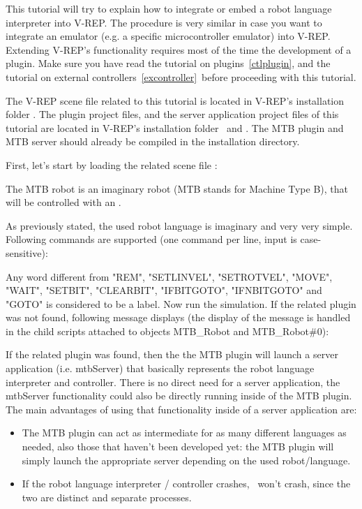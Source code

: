 \label{langtutor}

This tutorial will try to explain how to integrate or embed a robot language 
interpreter into V-REP. The procedure is very similar in case you want to 
integrate an emulator (e.g. a specific microcontroller emulator) into V-REP. 
Extending V-REP's functionality requires most of the time the development 
of a plugin. Make sure you have read the tutorial on plugins\ \ref{ctlplugin}, 
and the tutorial on external controllers\ \ref{excontroller}\ before 
proceeding with this tutorial.

The V-REP scene file related to this tutorial is located in V-REP's 
installation folder . The plugin 
project files, and the server application project files of this tutorial 
are located in V-REP's installation folder \
and . The MTB plugin and MTB server should 
already be compiled in the installation directory.

\clearpage
First, let's start by loading the related scene file 
:


The MTB robot is an imaginary robot (MTB stands for Machine Type B), that 
will be controlled with an \term{imaginary robot language}.

As previously stated, the used robot language is imaginary and very very 
simple. Following commands are supported (one command per line, input is 
case-sensitive):


Any word different from "REM", "SETLINVEL", "SETROTVEL", "MOVE", "WAIT", 
"SETBIT", "CLEARBIT", "IFBITGOTO", "IFNBITGOTO" and "GOTO" is considered to 
be a label. Now run the simulation. If the related plugin was not found, 
following message displays (the display of the message is handled in the 
child scripts attached to objects MTB\_Robot and MTB\_Robot\#0):


If the related plugin was found, then the the MTB plugin will launch a 
server application (i.e. mtbServer) that basically represents the robot 
language interpreter and controller. There is no direct need for a server 
application, the mtbServer functionality could also be directly running 
inside of the MTB plugin. The main advantages of using that functionality 
inside of a server application are:
\begin{itemize}[nosep]
	\item The MTB plugin can act as intermediate for as many different 
		languages as needed, also those that haven't been developed yet: 
		the MTB plugin will simply launch the appropriate server depending 
		on the used robot/language.
	\item If the robot language interpreter / controller crashes, \vrep\
		won't crash, since the two are distinct and separate processes.
\end{itemize}

